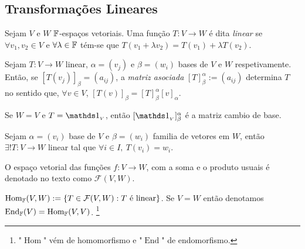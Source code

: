 \subsection*{Transformações Lineares}

\begin{definition}
    Sejam \(V\) e \(W\) \(\mathbb{F}\)-espaços vetoriais. Uma função \(T: V \to W\) é dita \emph{linear} se \(\forall v_1, v_2 \in V\) e \(\forall \lambda \in \mathbb{F} \) tém-se que \(T(v_1 + \lambda v_2) = T(v_1) + \lambda T(v_2)\). 
\end{definition}

\begin{definition}
    Sejam \(T: V \to W\) linear, \(\alpha = (v_j)\) e \(\beta = (w_i)\) bases de \(V\) e \(W \) respetivamente. Então, se \([T(v_j)]_\beta= (a_{ij})\), a \emph{matriz asociada} \([T]_\beta^\alpha := (a_{ij})\) determina \(T\) no sentido que, \(\forall v \in V\), \([T(v)]_\beta = [T]_\beta^\alpha [v]_\alpha\). 
\end{definition}

\begin{note}
    Se \(W= V \) e \(T = \id_{_V}\), então \([\id_{_V}]^\alpha_\beta\) é a matriz cambio de base. 
\end{note}

\begin{theorem}
    Sejam \(\alpha = (v_i)\) base de \(V\) e \(\beta = (w_i)\) familia de vetores em \(W\), então \(\exists ! T:V\to W \) linear tal que \(\forall i \in I,\ T(v_i) = w_i\). 
\end{theorem}
    
\begin{note}
    O espaço vetorial das funções \(f: V \to W\), com a soma e o produto usuais é denotado no texto como \(\mathcal{F}(V,W)\).   
\end{note}

\renewcommand{\hom}{\operatorname{Hom}_\F}
\newcommand{\ehom}{\operatorname{End}_\F}

\begin{definition}  
  \(\hom(V,W):= \{T \in \mathcal{F}(V,W): T \text{ é linear}\} \). Se \(V = W\) então denotamos \(\ehom(V) = \hom(V,V)\). \footnote{"\(\operatorname{Hom}\)" vém de homomorfismo e "\(\operatorname{End}\)" de endomorfismo.}   
\end{definition}   

